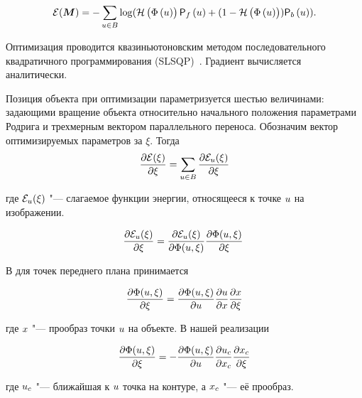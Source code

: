 \begin{equation}\label{eqn:err_func}
    \mathcal{E}(\bm{M}) = - \sum\limits_{\mathnormal{u} \in B}
        \log(\mathcal{H} \left( \Phi \left( \mathnormal{u} \right) \right) \mathsf{P}_f \left( \mathnormal{u} \right) + (1 - \mathcal{H} \left( \Phi \left( \mathnormal{u} \right) \right))\mathsf{P}_b \left( \mathnormal{u} \right))
\text{.}
\end{equation}

Оптимизация проводится квазиньютоновским методом последовательного
квадратичного программирования (SLSQP)~\cite{SLSQP}.
Градиент вычисляется аналитически.

Позиция объекта при оптимизации параметризуется шестью величинами:
задающими вращение объекта относительно начального положения параметрами Родрига
и трехмерным вектором параллельного переноса.
Обозначим вектор оптимизируемых параметров за $\xi$.
Тогда 
\begin{equation}\label{eqn:err_diff}
    \frac{\partial \mathcal{E}(\xi)}{\partial \xi} = \sum\limits_{\mathnormal{u} \in B}
        \frac{\partial {\mathcal{E}}_{\mathnormal{u}}(\xi)}{\partial \xi}
\end{equation}
 
где ${\mathcal{E}}_{\mathnormal{u}}(\xi)$ "--- слагаемое функции энергии, относящееся к точке $\mathnormal{u}$ на изображении.

\begin{equation}\label{eqn:err_pixel_diff}
    \frac{\partial {\mathcal{E}}_{\mathnormal{u}}(\xi)}{\partial \xi} = 
        \frac{\partial {\mathcal{E}}_{\mathnormal{u}}(\xi)}{\partial \Phi (\mathnormal{u}, \xi)}
        \frac{\partial \Phi (\mathnormal{u}, \xi)}{\partial \xi}
        \frac{}{}
\end{equation} 

В \cite{Tjaden2018} для точек переднего плана принимается

\begin{equation}\label{eqn:cdist_diff_tjaden}
    \frac{\partial \Phi (\mathnormal{u}, \xi)}{\partial \xi} = 
    \frac{\partial \Phi (\mathnormal{u}, \xi)}{\partial \mathnormal{u}}
    \frac{\partial \mathnormal{u}}{\partial \mathnormal{x}}
    \frac{\partial \mathnormal{x}}{\partial \xi}
\end{equation}

где $\mathnormal{x}$ "--- прообраз точки $\mathnormal{u}$ на объекте.
В нашей реализации

\begin{equation}\label{eqn:cdist_diff_our}
    \frac{\partial \Phi(\mathnormal{u}, \xi)}{\partial \xi} = 
    - \frac{\partial \Phi (\mathnormal{u}, \xi)}{\partial \mathnormal{u}}
    \frac{\partial \mathnormal{u}_c}{\partial \mathnormal{x}_c}
    \frac{\partial \mathnormal{x}_c}{\partial \xi}
\end{equation}

где $\mathnormal{u}_c$ "--- ближайшая к $\mathnormal{u}$ точка на контуре, а $\mathnormal{x}_c$ "--- её прообраз.

